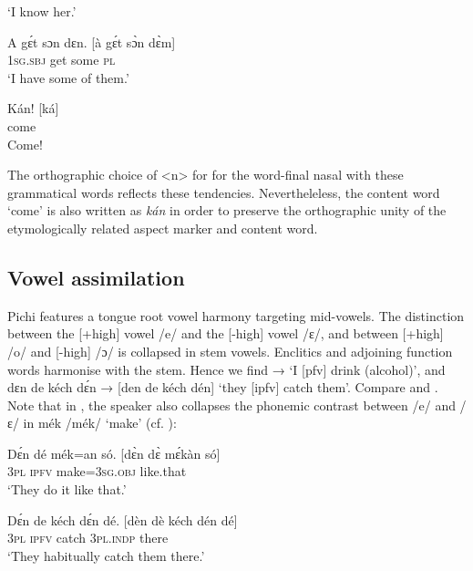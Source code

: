 \glt ‘I know her.’
\z


\ea%
    \label{ex:key:33}
    \gll   A    gɛ́t  sɔn    dɛn.        [à  gɛ́t  sɔ̀n  dɛ̀m]\\
\textsc{1sg.sbj}  get  some  \textsc{pl}\\

\glt ‘I have some of them.’
\z


\ea%
    \label{ex:key:34}
    \gll   Kán!                  [ká]\\
come\\

\glt Come!
\z

The orthographic choice of <n> for for the word-final nasal with these grammatical words reflects these tendencies. Nevertheleless, the content word ‘come’ is also written as \textit{kán} in order to preserve the orthographic unity of the etymologically related aspect marker and content word. 

\subsection{Vowel assimilation}\label{sec:2.5.3}

Pichi features a tongue root vowel harmony targeting mid-vowels. The distinction between the [+high] vowel /e/ and the [-high] vowel /ɛ/, and between [+high] /o/ and [-high] /ɔ/ is collapsed in stem vowels. Enclitics and adjoining function words harmonise with the stem. Hence we find → ‘I [pfv] drink (alcohol)’, and dɛn de kéch dɛ́n → [den de kéch dén] ‘they [ipfv] catch them’. Compare  and . Note that in , the speaker also collapses the phonemic contrast between /e/ and /ɛ/ in mék /mék/ ‘make’ (cf. ):


\ea%
    \label{ex:key:35}
    \gll   Dɛ́n  dé  mék=an    só.          [dɛ̀n  dɛ̀ mɛ́kàn só]\\
\textsc{3pl}  \textsc{ipfv}  make=\textsc{3sg.obj}  like.that\\

\glt ‘They do it like that.’
\z


\ea%
    \label{ex:key:36}
    \gll   Dɛ́n  de  kéch  dɛ́n    dé.        [dèn   dè kéch dén dé]\\
\textsc{3pl}  \textsc{ipfv}  catch  \textsc{3pl.indp}  there\\

\glt ‘They habitually catch them there.’
\z


